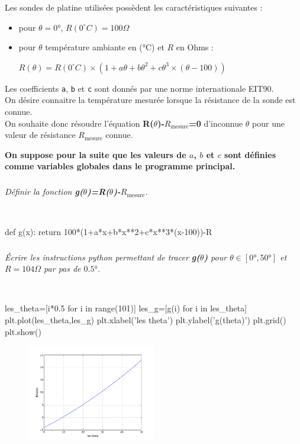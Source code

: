 \documentclass[10pt,fleqn]{article} %
\begin{document}
\vspace{0.5cm}
Les sondes de platine utilisées possèdent les caractéristiques suivantes :
\begin{itemize}
	\item pour $\theta=0°$, $R(0^{\circ}C)=100\Omega$
	\item pour $\theta$ température ambiante en (°C) et $R$ en Ohms :
	
	\begin{center}
	$R(\theta)=R(0^{\circ}C)\times(1+a\theta+b{\theta}^2+c{\theta}^3\times(\theta-100))$
	\end{center}
	
\end{itemize}
Les coefficients \texttt{a}, \texttt{b} et \texttt{c} sont donnés par une norme internationale EIT90.\\

On désire connaitre la température mesurée lorsque la résistance de la sonde est connue.\\
On souhaite donc résoudre l'équation \textbf{R($\theta$)-$R_{\text{mesure}}$=0} d'inconnue $\theta$ pour une valeur de résistance $R_{\text{mesure}}$ connue.

\textbf{On suppose pour la suite que les valeurs de $a$, $b$ et $c$ sont définies comme 
variables globales dans le programme principal.} \\

\subparagraph{}
\textit{Définir la fonction \textbf{g($\theta$)=R($\theta$)-$R_{\text{mesure}}$}.}

\ifprof
\begin{corrige}~\
\begin{python}
def g(x):
    return 100*(1+a*x+b*x**2+c*x**3*(x-100))-R
\end{python}
\end{corrige}
\else
\fi

\subparagraph{}
\textit{Écrire les instructions python permettant de tracer \textbf{g($\theta$)} pour $\theta\in[0°,50°]$ et $R=104\Omega$ par pas de $0.5°$.}

\ifprof
\begin{corrige}~\
\begin{python}
les_theta=[i*0.5 for i in range(101)]
les_g=[g(i) for i in les_theta]
plt.plot(les_theta,les_g)
plt.xlabel('les theta')
plt.ylabel('g(theta)')
plt.grid()
plt.show()
\end{python}
\end{corrige}
\else
\fi

\begin{figure}[h]
	\centering
		\includegraphics[width=0.5\textwidth]{images/courbe.png}
\end{figure}
\end{document}
